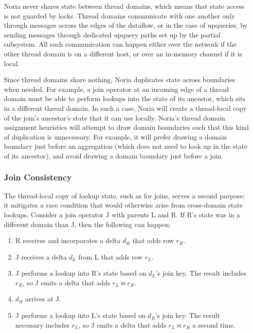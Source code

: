 Noria never shares state between thread domains, which means that state access
is not guarded by locks. Thread domains communicate with one another only
through messages across the edges of the dataflow, or in the case of upqueries,
by sending messages through dedicated upquery paths set up by the partial
subsystem. All such communication can happen either over the network if the
other thread domain is on a different host, or over an in-memory channel if it
is local.

Since thread domains share nothing, Noria duplicates state across boundaries
when needed. For example, a join operator at an incoming edge of a thread domain
must be able to perform lookups into the state of its ancestor, which sits in a
different thread domain. In such a case, Noria will create a thread-local copy
of the join's ancestor's state that it can use locally. Noria's thread domain
assignment heuristics will attempt to draw domain boundaries  such that this
kind of duplication is unnecessary. For example, it will prefer drawing a domain
boundary just before an aggregation (which does not need to look up in the state
of its ancestor), and avoid drawing a domain boundary just before a join.

\subsubsection{Join Consistency}
\label{s:join-state-dupe}

The thread-local copy of lookup state, such as for joins, serves a second
purpose: it mitigates a race condition that would otherwise arise from
cross-domain state lookups. Consider a join operator J with parents L and R. If
R's state was in a different domain than J, then the following can happen:

\begin{enumerate}
  \item R receives and incorporates a delta $d_R$ that adds row $r_R$.
  \item J receives a delta $d_L$ from L that adds row $r_L$.
  \item J performs a lookup into R's state based on $d_L$'s join key. The result
        includes $r_R$, so J emits a delta that adds $r_L \bowtie r_R$.
  \item $d_R$ arrives at J.
  \item J performs a lookup into L's state based on $d_R$'s join key. The result
        necessary includes $r_L$, so J emits a delta that adds $r_L \bowtie r_R$
        a second time.
\end{enumerate}


